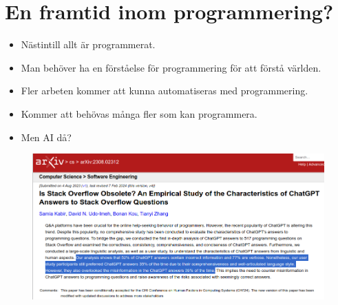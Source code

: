 

\section[Framtid inom det?]{En framtid inom programmering?}

\begin{frame}
  \begin{example}[Förståelse]
    \begin{itemize}
      \item Nästintill allt är programmerat.
      \item Man behöver ha en förståelse för programmering för att förstå 
        världen.
    \end{itemize}
  \end{example}

  \begin{example}[Arbete]
    \begin{itemize}
      \item Fler arbeten kommer att kunna automatiseras med programmering.
      \item Kommer att behövas många fler som kan programmera.
    \end{itemize}
  \end{example}
\end{frame}

\begin{frame}
  \begin{question}
    \begin{itemize}
      \item Men AI då?
    \end{itemize}
  \end{question}

  \pause

  \begin{figure}
    \includegraphics[width=\columnwidth]{fig/chatgpt-wrong.png}
  \end{figure}
\end{frame}
